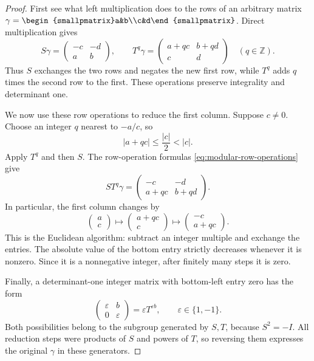 \begin{proof}
First see what left multiplication does to the rows of an arbitrary matrix $\gamma=\begin{smallpmatrix}a&b\\c&d\end{smallpmatrix}$. Direct multiplication gives
\begin{equation}\label{eq:modular-row-operations}
 S\gamma=\begin{pmatrix}-c&-d\\a&b\end{pmatrix},\qquad
 T^q\gamma=\begin{pmatrix}a+qc&b+qd\\c&d\end{pmatrix}
 \quad(q\in\mathbb Z).
\end{equation}
Thus $S$ exchanges the two rows and negates the new first row, while $T^q$ adds $q$ times the second row to the first. These operations preserve integrality and determinant one.

We now use these row operations to reduce the first column. Suppose $c\ne0$. Choose an integer $q$ nearest to $-a/c$, so
\[
 |a+qc|\leq\frac{|c|}{2}<|c|.
\]
Apply $T^q$ and then $S$. The row-operation formulas \eqref{eq:modular-row-operations} give
\[
 ST^q\gamma=\begin{pmatrix}-c&-d\\a+qc&b+qd\end{pmatrix}.
\]
In particular, the first column changes by
\[
 \begin{pmatrix}a\\c\end{pmatrix}
 \longmapsto
 \begin{pmatrix}a+qc\\c\end{pmatrix}
 \longmapsto
 \begin{pmatrix}-c\\a+qc\end{pmatrix}.
\]
This is the Euclidean algorithm: subtract an integer multiple and exchange the entries. The absolute value of the bottom entry strictly decreases whenever it is nonzero. Since it is a nonnegative integer, after finitely many steps it is zero.

Finally, a determinant-one integer matrix with bottom-left entry zero has the form
\[
 \begin{pmatrix}\varepsilon&b\\0&\varepsilon\end{pmatrix}
 =\varepsilon T^{\varepsilon b},\qquad \varepsilon\in\{1,-1\}.
\]
Both possibilities belong to the subgroup generated by $S,T$, because $S^2=-I$. All reduction steps were products of $S$ and powers of $T$, so reversing them expresses the original $\gamma$ in these generators.
\end{proof}

